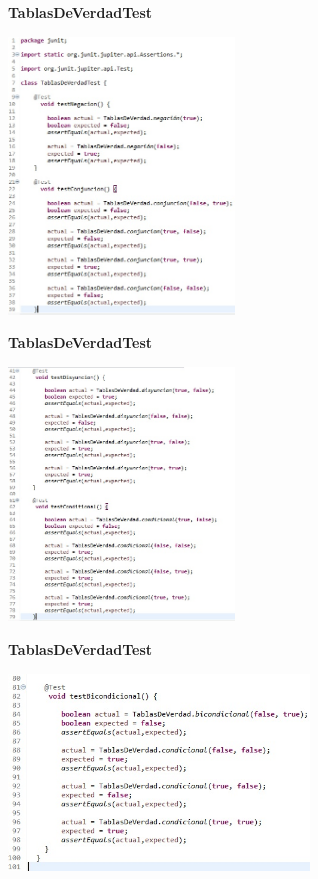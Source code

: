 \documentclass[11pt]{beamer}
\begin{document}

\begin{frame}{\textbf{TablasDeVerdadTest}}

\begin{center}
\includegraphics[width=6.0cm]{img/Prueba3.1.jpg}
\end{center}

\end{frame}


\begin{frame}{\textbf{TablasDeVerdadTest}}

\begin{center}
\includegraphics[width=6.0cm]{img/Prueba3.2.jpg}
\end{center}

\end{frame}


\begin{frame}{\textbf{TablasDeVerdadTest}}

\begin{center}
\includegraphics[width=8.0cm]{img/Prueba3.3.jpg}
\end{center}

\end{frame}
\end{document}
